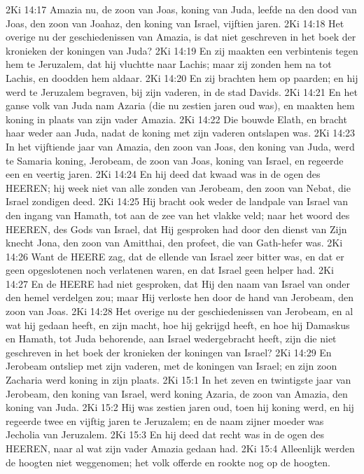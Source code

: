 2Ki 14:17  Amazia nu, de zoon van Joas, koning van Juda, leefde na den dood van Joas, den zoon van Joahaz, den koning van Israel, vijftien jaren.
2Ki 14:18  Het overige nu der geschiedenissen van Amazia, is dat niet geschreven in het boek der kronieken der koningen van Juda?
2Ki 14:19  En zij maakten een verbintenis tegen hem te Jeruzalem, dat hij vluchtte naar Lachis; maar zij zonden hem na tot Lachis, en doodden hem aldaar.
2Ki 14:20  En zij brachten hem op paarden; en hij werd te Jeruzalem begraven, bij zijn vaderen, in de stad Davids.
2Ki 14:21  En het ganse volk van Juda nam Azaria (die nu zestien jaren oud was), en maakten hem koning in plaats van zijn vader Amazia.
2Ki 14:22  Die bouwde Elath, en bracht haar weder aan Juda, nadat de koning met zijn vaderen ontslapen was.
2Ki 14:23  In het vijftiende jaar van Amazia, den zoon van Joas, den koning van Juda, werd te Samaria koning, Jerobeam, de zoon van Joas, koning van Israel, en regeerde een en veertig jaren.
2Ki 14:24  En hij deed dat kwaad was in de ogen des HEEREN; hij week niet van alle zonden van Jerobeam, den zoon van Nebat, die Israel zondigen deed.
2Ki 14:25  Hij bracht ook weder de landpale van Israel van den ingang van Hamath, tot aan de zee van het vlakke veld; naar het woord des HEEREN, des Gods van Israel, dat Hij gesproken had door den dienst van Zijn knecht Jona, den zoon van Amitthai, den profeet, die van Gath-hefer was.
2Ki 14:26  Want de HEERE zag, dat de ellende van Israel zeer bitter was, en dat er geen opgeslotenen noch verlatenen waren, en dat Israel geen helper had.
2Ki 14:27  En de HEERE had niet gesproken, dat Hij den naam van Israel van onder den hemel verdelgen zou; maar Hij verloste hen door de hand van Jerobeam, den zoon van Joas.
2Ki 14:28  Het overige nu der geschiedenissen van Jerobeam, en al wat hij gedaan heeft, en zijn macht, hoe hij gekrijgd heeft, en hoe hij Damaskus en Hamath, tot Juda behorende, aan Israel wedergebracht heeft, zijn die niet geschreven in het boek der kronieken der koningen van Israel?
2Ki 14:29  En Jerobeam ontsliep met zijn vaderen, met de koningen van Israel; en zijn zoon Zacharia werd koning in zijn plaats.
2Ki 15:1  In het zeven en twintigste jaar van Jerobeam, den koning van Israel, werd koning Azaria, de zoon van Amazia, den koning van Juda.
2Ki 15:2  Hij was zestien jaren oud, toen hij koning werd, en hij regeerde twee en vijftig jaren te Jeruzalem; en de naam zijner moeder was Jecholia van Jeruzalem.
2Ki 15:3  En hij deed dat recht was in de ogen des HEEREN, naar al wat zijn vader Amazia gedaan had.
2Ki 15:4  Alleenlijk werden de hoogten niet weggenomen; het volk offerde en rookte nog op de hoogten.
